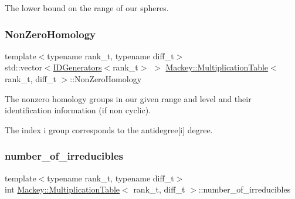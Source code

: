 The lower bound on the range of our spheres. 

\mbox{\label{classMackey_1_1MultiplicationTable_ad392b9570c511595a08642f5d54d20eb}} 
\subsubsection{\texorpdfstring{Non\+Zero\+Homology}{NonZeroHomology}}
{\footnotesize\ttfamily template$<$typename rank\+\_\+t, typename diff\+\_\+t$>$ \\
std\+::vector$<$\hyperlink{classMackey_1_1IDGenerators}{I\+D\+Generators}$<$rank\+\_\+t$>$ $>$ \hyperlink{classMackey_1_1MultiplicationTable}{Mackey\+::\+Multiplication\+Table}$<$ rank\+\_\+t, diff\+\_\+t $>$\+::Non\+Zero\+Homology\hspace{0.3cm}{\ttfamily [protected]}}



The nonzero homology groups in our given range and level and their identification information (if non cyclic). 

The index i group corresponds to the antidegree\mbox{[}i\mbox{]} degree. \mbox{\label{classMackey_1_1MultiplicationTable_a2a87b9a2f25f4e99c903c8f874fad4fb}} 
\subsubsection{\texorpdfstring{number\+\_\+of\+\_\+irreducibles}{number\_of\_irreducibles}}
{\footnotesize\ttfamily template$<$typename rank\+\_\+t, typename diff\+\_\+t$>$ \\
int \hyperlink{classMackey_1_1MultiplicationTable}{Mackey\+::\+Multiplication\+Table}$<$ rank\+\_\+t, diff\+\_\+t $>$\+::number\+\_\+of\+\_\+irreducibles\hspace{0.3cm}{\ttfamily [protected]}}



